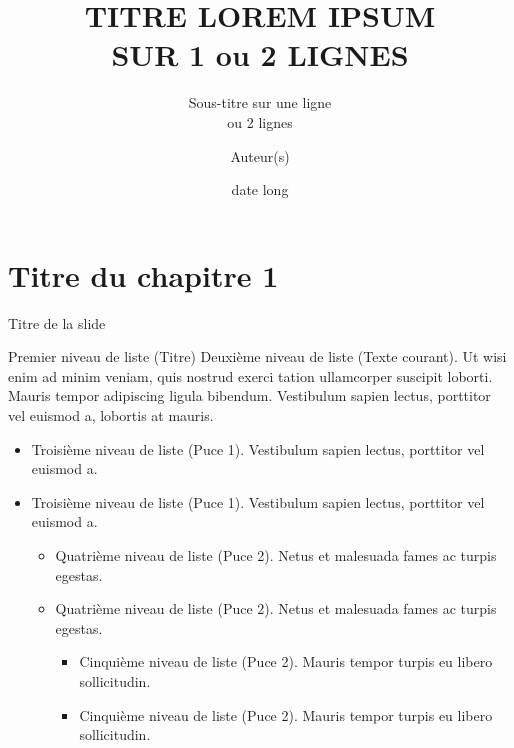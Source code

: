 \documentclass[A4,svgnames,9pt,aspectratio=169]{beamer}
\title[titrecourt]{TITRE LOREM IPSUM\\[4pt] SUR 1 ou 2 LIGNES}
\subtitle{Sous-titre sur une ligne\\ ou 2 lignes}
\date[00/00/202X]{date long}
\author[A. et al.]{Auteur(s)}
\begin{document}

\frame{\titlepage}


\renewcommand{\contentsname}{Sommaire}



\frame{\tocpage}

 
\section{Titre du chapitre 1}
\frame{\sectionpage}


\begin{frame}{Titre de la slide}
    \begin{block}{Premier niveau de liste (Titre)}
       Deuxième niveau de liste (Texte courant). Ut wisi enim ad minim veniam, quis nostrud exerci tation
       ullamcorper suscipit loborti. Mauris tempor adipiscing ligula bibendum. Vestibulum sapien lectus,
       porttitor vel euismod a, lobortis at mauris.
      \begin{itemize}
         \item Troisième niveau de liste (Puce 1). Vestibulum sapien lectus, porttitor vel euismod a.
         \item Troisième niveau de liste (Puce 1). Vestibulum sapien lectus, porttitor vel euismod a.
         \begin{itemize}
            \item Quatrième niveau de liste (Puce 2). Netus et malesuada fames ac turpis egestas.
            \item Quatrième niveau de liste (Puce 2). Netus et malesuada fames ac turpis egestas.
            \begin{itemize}
               \item Cinquième niveau de liste (Puce 2). Mauris tempor turpis eu libero sollicitudin.
               \item Cinquième niveau de liste (Puce 2). Mauris tempor turpis eu libero sollicitudin.
            \end{itemize}
          \end{itemize}
        \end{itemize}
   \end{block}
\end{frame}
\end{document}
